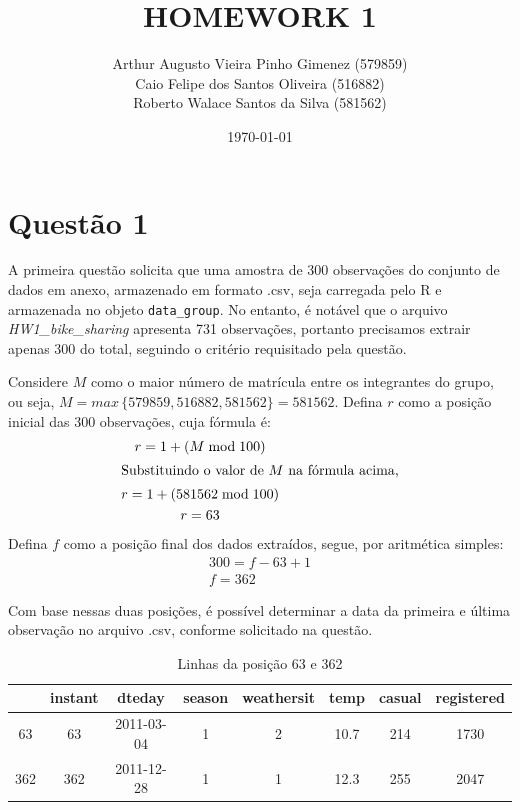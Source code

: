 \documentclass[a4paper, 12pt, titlepage]{article}
\title{HOMEWORK 1}
\author{Arthur Augusto Vieira Pinho Gimenez (579859)\\
        Caio Felipe dos Santos Oliveira  (516882) \\
        Roberto Walace Santos da Silva (581562)}
\date{\today}
\begin{document}
\maketitle
\tableofcontents
\newpage

\section*{Questão 1}

A primeira questão solicita que uma amostra de 300 observações do conjunto de dados em anexo, armazenado em formato .csv, seja carregada pelo R e armazenada no objeto \texttt{data\_group}. No entanto, é notável que o arquivo \textit{HW1\_bike\_sharing} apresenta 731 observações, portanto precisamos extrair apenas 300 do total, seguindo o critério requisitado pela questão.

Considere $M$ como o maior número de matrícula entre os integrantes do grupo, ou seja, $M=max \, \{579859, 516882, 581562\}=581562$. Defina $r$ como a posição inicial das 300 observações, cuja fórmula é:
\begin{gather*}
    r= 1 +(M \bmod 100) \\
    \intertext{Substituindo o valor de $M$ na fórmula acima,} 
    r= 1 +(581562 \bmod 100) \\
    r= 63
\end{gather*}
Defina $f$ como a posição final dos dados extraídos, segue, por aritmética simples:
\begin{gather*}
    300= f-63 +1\\
    f=362
\end{gather*}

Com base nessas duas posições, é possível determinar a data da primeira e última observação no arquivo .csv, conforme solicitado na questão.

\begin{table}[h!]
    \centering
    \caption{Linhas da posição 63 e 362}
    \label{tab:mascara_1u}
    \begin{tabular}{c|c|c|c|c|c|c|c}
        &instant &dteday &season &weathersit &temp &casual &registered \\ \hline
        63 &63 &2011-03-04 &1 &2 &10.7 &214 &1730 \\ \hline
        362 &362 &2011-12-28 &1 &1 &12.3 &255 &2047
    \end{tabular}
\end{table}
\end{document}
